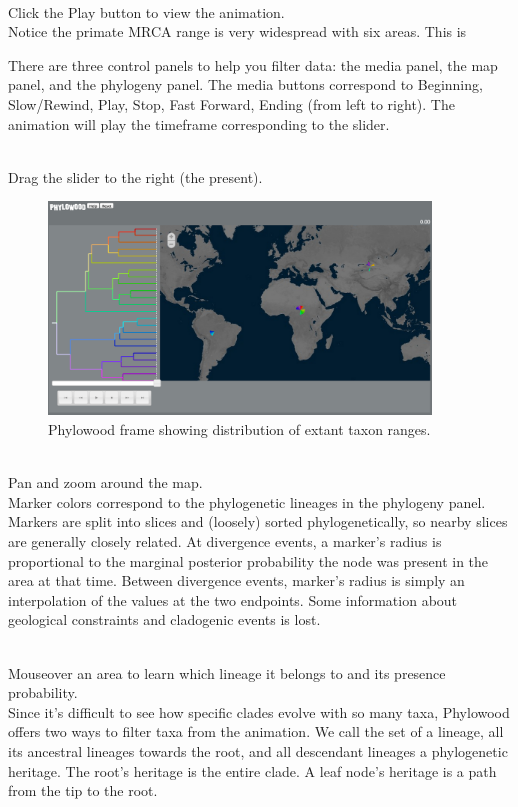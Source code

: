\noindent \\ \impmark Click the Play button to view the animation. \\

Notice the primate MRCA range is very widespread with six areas. This is

There are three control panels to help you filter data: the media panel, the map panel, and the phylogeny panel.
The media buttons correspond to Beginning, Slow/Rewind, Play, Stop, Fast Forward, Ending (from left to right).
The animation will play the timeframe corresponding to the slider.

\noindent \\ \impmark Drag the slider to the right (the present).

\begin{figure}[H]
\centering
\includegraphics[width=4in]{figures/bg_1_tips}
\caption{Phylowood frame showing distribution of extant taxon ranges.}
\end{figure}

\noindent \\ \impmark Pan and zoom around the map.\\

Marker colors correspond to the phylogenetic lineages in the phylogeny panel.
Markers are split into slices and (loosely) sorted phylogenetically, so nearby slices are generally closely related.
At divergence events, a marker's radius is proportional to the marginal posterior probability the node was present in the area at that time.
Between divergence events, marker's radius is simply an interpolation of the values at the two endpoints.
Some information about geological constraints and cladogenic events is lost.

\noindent \\ \impmark Mouseover an area to learn which lineage it belongs to and its presence probability. \\

Since it's difficult to see how specific clades evolve with so many taxa, Phylowood offers two ways to filter taxa from the animation.
We call the set of a lineage, all its ancestral lineages towards the root, and all descendant lineages a phylogenetic heritage.
The root's heritage is the entire clade.
A leaf node's heritage is a path from the tip to the root.


